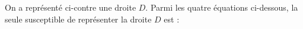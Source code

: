 
\hfill\begin{GraphiqueTikz}[x=1cm,y=0.8cm,Xmin=-1.25,Xmax=1.1,Ymin=-1.5,Ymax=1.75]
  \TracerAxesGrilles[Origine,Grille=false]{}{}
\end{GraphiqueTikz}\hfill\null

\smallskip

On a représenté ci-contre une droite $D$. Parmi les quatre équations ci-dessous, la seule susceptible de représenter la droite $D$ est :

\smallskip

